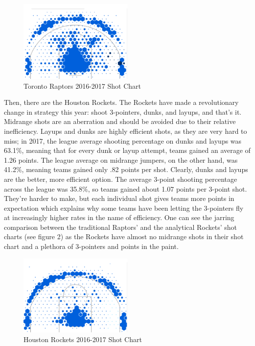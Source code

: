 \documentclass[12pt]{article}
\begin{document}
\begin{figure}[h]
\centering
\caption{Toronto Raptors 2016-2017 Shot Chart}
\includegraphics[width=0.5\textwidth]{Raptors}
\end{figure}

        	Then, there are the Houston Rockets. The Rockets have made a revolutionary change in strategy this year: shoot 3-pointers, dunks, and layups, and that's it. Midrange shots are an aberration and should be avoided due to their relative inefficiency. Layups and dunks are highly efficient shots, as they are very hard to miss; in 2017, the league average shooting percentage on dunks and layups was 63.1$\%$, meaning that for every dunk or layup attempt, teams gained an average of 1.26 points. The league average on midrange jumpers, on the other hand, was 41.2$\%$, meaning teams gained only .82 points per shot. Clearly, dunks and layups are the better, more efficient option. The average 3-point shooting percentage across the league was 35.8$\%$, so teams gained about 1.07 points per 3-point shot. They're harder to make, but each individual shot gives teams more points in expectation which explains why some teams have been letting the 3-pointers fly at increasingly higher rates in the name of efficiency. One can see the jarring comparison between the traditional Raptors' and the analytical Rockets' shot charts (see figure 2) as the Rockets have almost no midrange shots in their shot chart and a plethora of 3-pointers and points in the paint.\par
\begin{figure}[h]
\centering
\caption{Houston Rockets 2016-2017 Shot Chart}
\includegraphics[width=0.5\textwidth]{Rockets}
\end{figure}
\end{document}
